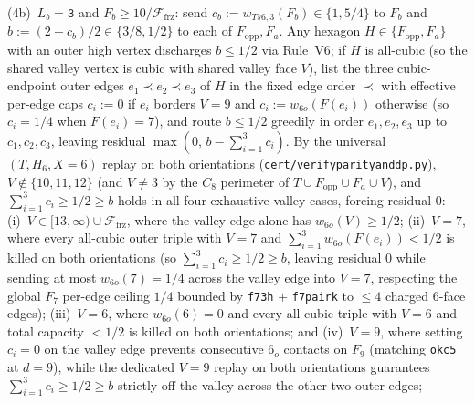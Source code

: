\documentclass[11pt,reqno]{amsart}
\theoremstyle{plain}
\theoremstyle{definition}
\theoremstyle{remark}
\newcommand{\Ffrz}{\mathcal{F}_{\mathrm{frz}}}
\DeclareRobustCommand{\_}{\ifmmode\text{\textunderscore}\else\textunderscore\allowbreak\fi}
\begin{document}
\begin{itemize}[leftmargin=1.8em]
\begin{enumerate}[label=(\roman*),leftmargin=2.0em]
\begin{itemize}[leftmargin=1.4em]
            (4b)~$L_b = \texttt{3}$ and $F_b \ge 10/\Ffrz$: send $c_b := w_{Ts6,3}(F_b) \in \{1, 5/4\}$ to $F_b$ and $b := (2 - c_b)/2 \in \{3/8, 1/2\}$ to each of $F_{\mathrm{opp}}, F_a$. Any hexagon $H \in \{F_{\mathrm{opp}}, F_a\}$ with an outer high vertex discharges $b \le 1/2$ via Rule~V6; if $H$ is all-cubic (so the shared valley vertex is cubic with shared valley face $V$), list the three cubic-endpoint outer edges $e_1 \prec e_2 \prec e_3$ of $H$ in the fixed edge order $\prec$ with effective per-edge caps $c_i := 0$ if $e_i$ borders $V = 9$ and $c_i := w_{6o}(F(e_i))$ otherwise (so $c_i = 1/4$ when $F(e_i) = 7$), and route $b \le 1/2$ greedily in order $e_1, e_2, e_3$ up to $c_1, c_2, c_3$, leaving residual $\max(0,\, b - \sum_{i=1}^3 c_i)$. By the universal $(T, H_6, X = 6)$ replay on both orientations (\texttt{cert/verify\_parity\_and\_dp.py}), $V \notin \{10, 11, 12\}$ (and $V \neq 3$ by the $C_8$ perimeter of $T \cup F_{\mathrm{opp}} \cup F_a \cup V$), and $\sum_{i=1}^3 c_i \ge 1/2 \ge b$ holds in all four exhaustive valley cases, forcing residual $0$: (i)~$V \in [13, \infty) \cup \Ffrz$, where the valley edge alone has $w_{6o}(V) \ge 1/2$; (ii)~$V = 7$, where every all-cubic outer triple with $V = 7$ and $\sum_{i=1}^3 w_{6o}(F(e_i)) < 1/2$ is killed on both orientations (so $\sum_{i=1}^3 c_i \ge 1/2 \ge b$, leaving residual $0$ while sending at most $w_{6o}(7) = 1/4$ across the valley edge into $V = 7$, respecting the global $F_7$ per-edge ceiling $1/4$ bounded by \texttt{f7\_3h} $+$ \texttt{f7\_pair\_k} to $\le 4$ charged $6$-face edges); (iii)~$V = 6$, where $w_{6o}(6) = 0$ and every all-cubic triple with $V = 6$ and total capacity $< 1/2$ is killed on both orientations; and (iv)~$V = 9$, where setting $c_i = 0$ on the valley edge prevents consecutive $6_o$ contacts on $F_9$ (matching \texttt{ok\_c5} at $d = 9$), while the dedicated $V = 9$ replay on both orientations guarantees $\sum_{i=1}^3 c_i \ge 1/2 \ge b$ strictly off the valley across the other two outer edges;

\end{itemize}
\end{enumerate}
\end{itemize}
\end{document}

